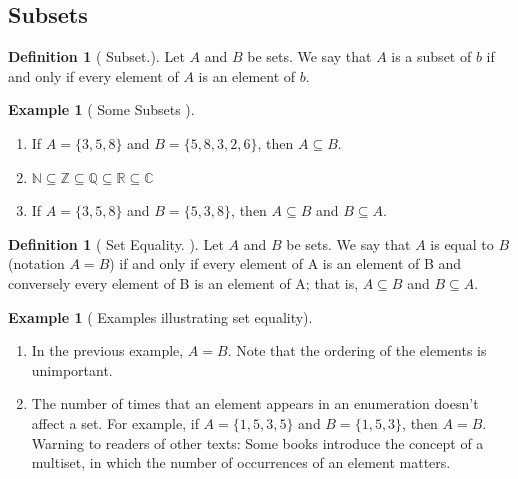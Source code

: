 \documentclass[10pt,]{book}
\theoremstyle{plain}
\theoremstyle{definition}
\newtheorem{definition}[theorem]{Definition}
\newtheorem{example}[theorem]{Example}
\begin{document}
\subsection[Subsets]{Subsets}\label{subsection-2}
\begin{definition}[ Subset.]\label{subset.}
 Let \(A\) and \(B\) be sets. We say that \(A\) is a subset of \(b\)  if and only if every element of \(A\) is an element of \(b\). 
\end{definition}
\label{notation-2}
\begin{example}[ Some Subsets ]\label{Some_Subsets}
\leavevmode%
\begin{enumerate}
\item\hypertarget{li-17}{} If \(A = \{3, 5, 8\}\) and \(B = \{5, 8, 3, 2, 6\}\), then \(A\subseteq B\). \item\hypertarget{li-18}{}  \(\mathbb{N}\subseteq \mathbb{Z}\subseteq \mathbb{Q}\subseteq \mathbb{R}\subseteq \mathbb{C}\) 
 \item\hypertarget{li-19}{}If \(A = \{3, 5, 8\}\) and \(B = \{5, 3, 8\}\), then \(A \subseteq  B\) and \(B \subseteq  A\). \end{enumerate}

%
\end{example}
\begin{definition}[ Set Equality. ]\label{set_equality}
Let \(A\) and \(B\) be sets. We say that \(A\) is equal to \(B\) (notation \(A = B\)) if and only if every element of
A is an element of B and conversely every element of B is an element of A; that is, \(A \subseteq  B\) and \(B \subseteq  A\). 
\end{definition}
\begin{example}[ Examples illustrating set equality]\label{set_equality_examples}
\leavevmode%
\begin{multicols}{1}
\begin{enumerate}
\item\hypertarget{li-20}{}In the previous example, \(A = B\). Note that the ordering of the elements is unimportant. \item\hypertarget{li-21}{}The number of times that an element appears in an enumeration doesn't affect a set. For example, if \(A = \{1, 5, 3, 5\}\) and \(B = \{1, 5, 3\}\), then \(A = B\).  Warning to readers of other texts: Some books introduce the concept of a multiset, in which the number of occurrences of an element matters.\end{enumerate}
\end{multicols}

%
\end{example}
\end{document}
